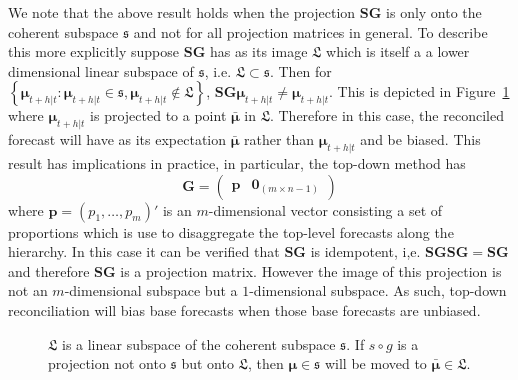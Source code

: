 \documentclass[12pt]{article}
\theoremstyle{definition}
\theoremstyle{property}
\begin{document}
	We note that the above result holds when the projection $\bm{SG}$ is only onto the coherent subspace $\mathfrak{s}$ and not for all projection matrices in general. To describe this more explicitly suppose $\bm{SG}$ has as its image  $\mathfrak{L}$ which is itself a a lower dimensional linear subspace of $\mathfrak{s}$, i.e. $\mathfrak{L}\subset\mathfrak{s}$. Then for $\left\{\bm{\mu}_{t+h|t}:\bm{\mu}_{t+h|t}\in\mathfrak{s},\bm{\mu}_{t+h|t}\notin\mathfrak{L}\right\}$,  $\bm{S}\bm{G}\bm{\mu}_{t+h|t} \ne \bm{\mu}_{t+h|t}$. This is depicted in Figure~\ref{fig:Schematic_3D} where $\bm{\mu}_{t+h|t}$ is projected to a point $\bar{\bm{\mu}}$ in $\mathfrak{L}$.  Therefore in this case, the reconciled forecast will have as its expectation $\bar{\bm{\mu}}$ rather than $\bm{\mu}_{t+h|t}$ and be biased.  This result has implications in practice, in particular, the top-down method \citep{Gross1990} has 
	\begin{equation}\label{eq:top-downG}
	\bm{G}=\begin{pmatrix}
	\bm{p} & \bm{0}_{(m \times n-1)}
	\end{pmatrix}
	\end{equation}
    where $\bm{p} = (p_1,\dots,p_m)'$ is an $m$-dimensional vector consisting a set of proportions which is use to disaggregate the top-level forecasts along the hierarchy.  In this case it can be verified that $\bm{SG}$ is idempotent, i,e. $\bm{SGSG}=\bm{SG}$ and therefore $\bm{SG}$ is a projection matrix.  However the image of this projection is not an $m$-dimensional subspace but a $1$-dimensional subspace.  As such, top-down reconciliation will bias base forecasts when those base forecasts are unbiased.
		
	\begin{figure}[!b]
		\centering
		\vspace{-0.9cm}
		\small
		\resizebox{\linewidth}{!}{
			
		}
		\caption{$\mathfrak{L}$ is a linear subspace of the coherent subspace $\mathfrak{s}$. If $s\circ g$ is a projection not onto $\mathfrak{s}$ but onto $\mathfrak{L}$, then $\bm{\mu} \in \mathfrak{s}$ will be moved to $\bar{\bm{\mu}} \in \mathfrak{L}$.}\label{fig:Schematic_3D}
	\end{figure}
	
	
	
\end{document}

